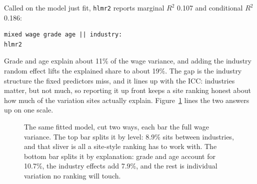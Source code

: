 \documentclass[
    a4paper,
    fontsize=10pt,
    twoside=true,
    numbers=noenddot,
]{kaobook}
\begin{document}
Called on the model just fit, \texttt{hlmr2} reports marginal $R^2$ 0.107 and conditional $R^2$ 0.186:
\par
{\footnotesize
\begin{verbatim}
mixed wage grade age || industry:
hlmr2
\end{verbatim}
}
Grade and age explain about 11\% of the wage variance, and adding the industry random effect lifts the explained share to about 19\%. The gap is the industry structure the fixed predictors miss, and it lines up with the ICC: industries matter, but not much, so reporting it up front keeps a site ranking honest about how much of the variation sites actually explain. Figure~\ref{fig:ch07-viz-varsplit} lines the two answers up on one scale.

\begin{figure}[htbp]
\centering
{}
\caption[Two reads of the same wage variance]{The same fitted model, cut two ways, each bar the full wage variance. The top bar splits it by level: 8.9\% sits between industries, and that sliver is all a site-style ranking has to work with. The bottom bar splits it by explanation: grade and age account for 10.7\%, the industry effects add 7.9\%, and the rest is individual variation no ranking will touch.}
\label{fig:ch07-viz-varsplit}
\end{figure}
\end{document}
